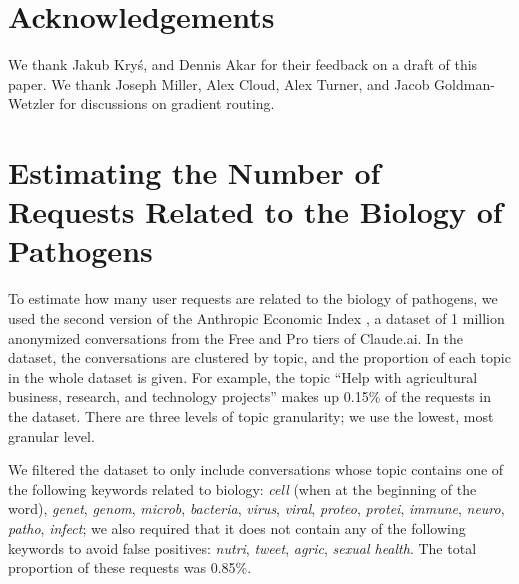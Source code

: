 \documentclass{article}
\theoremstyle{plain}
\theoremstyle{definition}
\theoremstyle{remark}
\begin{document}
\section*{Acknowledgements}

We thank Jakub Kryś, and Dennis Akar for their feedback on a draft of this paper. We thank Joseph Miller, Alex Cloud, Alex Turner, and Jacob Goldman-Wetzler for discussions on gradient routing.




\newpage
\appendix

\section{Estimating the Number of Requests Related to the Biology of Pathogens} \label{appendix:estimating-biology-requests}

To estimate how many user requests are related to the biology of pathogens, we used the second version of the Anthropic Economic Index \cite{handa2025economictasksperformedai}, a dataset of 1 million anonymized conversations from the Free and Pro tiers of Claude.ai.
In the dataset, the conversations are clustered by topic, and the proportion of each topic in the whole dataset is given.
For example, the topic ``Help with agricultural business, research, and technology projects'' makes up 0.15\% of the requests in the dataset.
There are three levels of topic granularity; we use the lowest, most granular level.

We filtered the dataset to only include conversations whose topic contains one of the following keywords related to biology: \emph{cell} (when at the beginning of the word), \emph{genet}, \emph{genom}, \emph{microb}, \emph{bacteria}, \emph{virus}, \emph{viral}, \emph{proteo}, \emph{protei}, \emph{immune}, \emph{neuro}, \emph{patho}, \emph{infect}; we also required that it does not contain any of the following keywords to avoid false positives: \emph{nutri}, \emph{tweet}, \emph{agric}, \emph{sexual health}.
The total proportion of these requests was 0.85\%.
\end{document}
